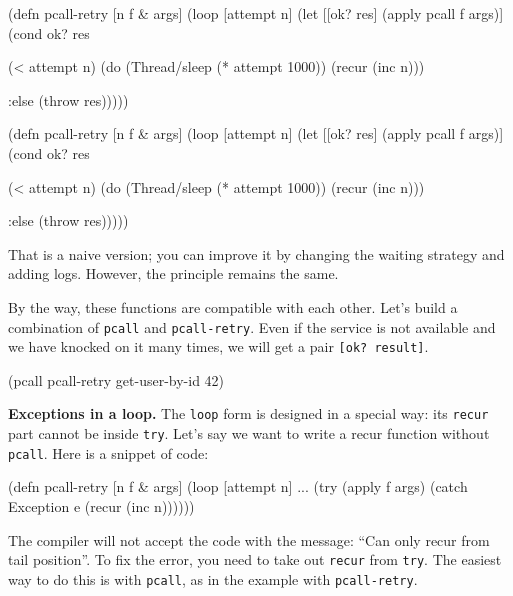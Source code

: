 
\ifx\DEVICETYPE\MOBILE

\begin{clojure}
(defn pcall-retry [n f & args]
  (loop [attempt n]
    (let [[ok? res] (apply pcall f args)]
      (cond
        ok? res

        (< attempt n)
        (do (Thread/sleep
              (* attempt 1000))
            (recur (inc n)))

        :else (throw res)))))
\end{clojure}

\else

\begin{clojure}
(defn pcall-retry [n f & args]
  (loop [attempt n]
    (let [[ok? res] (apply pcall f args)]
      (cond
        ok? res

        (< attempt n)
        (do (Thread/sleep (* attempt 1000))
            (recur (inc n)))

        :else (throw res)))))
\end{clojure}

\fi

That is a naive version; you can improve it by changing the waiting strategy and adding logs. However, the principle remains the same.

By the way, these functions are compatible with each other. Let's build a combination of \verb|pcall| and \verb|pcall-retry|. Even if the service is not available and we have knocked on it many times, we will get a pair \verb|[ok? result]|.

\begin{clojure}
(pcall pcall-retry get-user-by-id 42)
\end{clojure}

\textbf{ Exceptions in a loop.} The \verb|loop| form is designed in a special way: its \verb|recur| part cannot be inside \verb|try|. Let's say we want to write a recur function without \verb|pcall|. Here is a snippet of code:


\begin{clojure}
(defn pcall-retry [n f & args]
  (loop [attempt n]
    ...
    (try
      (apply f args)
      (catch Exception e
        (recur (inc n))))))
\end{clojure}

The compiler will not accept the code with the message: ``Can only recur from tail position''. To fix the error, you need to take out \verb|recur| from \verb|try|. The easiest way to do this is with \verb|pcall|, as in the example with \verb|pcall-retry|.

